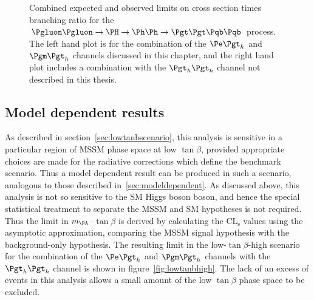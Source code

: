 \begin{figure}
\begin{center}

\end{center}
\caption[Combined expected and observed limits on cross section times branching ratio for the
$\Pgluon\Pgluon\to\PH\to\Ph\Ph\to\Pgt\Pgt\Pqb\Pqb$ process.]{
Combined expected and observed limits on cross section times branching ratio for the
$\Pgluon\Pgluon\to\PH\to\Ph\Ph\to\Pgt\Pgt\Pqb\Pqb$ process. The left hand plot is for the
combination of the $\etau$ and $\mutau$ channels discussed in this chapter, and
the right hand plot includes a combination with the $\tautau$ channel not
described in this thesis.}
\label{fig:HhhCmblimits}
\end{figure}

\subsection{Model dependent results}

As described in section~\ref{sec:lowtanbscenario}, this analysis is sensitive in
a particular region of \ac{MSSM} phase space at low $\tan\beta$, provided
appropriate choices are made for the radiative corrections which define the
benchmark scenario. Thus a model dependent result can be produced in such a
scenario, analogous to those described in~\ref{sec:modeldependent}. As discussed
above, this analysis is not so sensitive to the \ac{SM} Higgs boson boson, and hence
the special statistical treatment to separate the \ac{MSSM} and \ac{SM}
hypotheses is not required. Thus the limit in $m_{\PA}$--$\tan\beta$ is derived
by calculating the $\mathrm{CL_{s}}$ values using the asymptotic approximation, comparing
the \ac{MSSM} signal hypothesis with the background-only hypothesis. The
resulting limit in the low-$\tan\beta$-high scenario for the combination of the
$\etau$ and $\mutau$ channels with the $\tautau$ channel is shown in
figure~\ref{fig:lowtanbhigh}. The lack of an excess of events in this analysis
allows a small amount of the low $\tan\beta$ phase space to be excluded.

